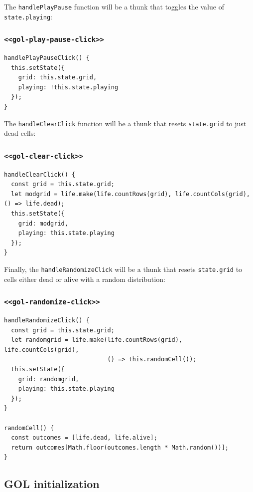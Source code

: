 \documentclass[11pt]{article}
\begin{document}
The \texttt{handlePlayPause} function will be a thunk that toggles the value of \texttt{state.playing}:

\subsubsection*{\texttt{<<gol-play-pause-click>>}}
\label{sec:orgfba2739}
\begin{verbatim}
handlePlayPauseClick() {
  this.setState({
    grid: this.state.grid,
    playing: !this.state.playing
  });
}
\end{verbatim}

The \texttt{handleClearClick} function will be a thunk that resets \texttt{state.grid} to just dead cells:

\subsubsection*{\texttt{<<gol-clear-click>>}}
\label{sec:orgad08d93}
\begin{verbatim}
handleClearClick() {
  const grid = this.state.grid;
  let modgrid = life.make(life.countRows(grid), life.countCols(grid), () => life.dead);
  this.setState({
    grid: modgrid,
    playing: this.state.playing
  });
}
\end{verbatim}

Finally, the \texttt{handleRandomizeClick} will be a thunk that resets \texttt{state.grid} to cells either dead or alive with a random distribution:

\subsubsection*{\texttt{<<gol-randomize-click>>}}
\label{sec:org8ac9ccc}
\begin{verbatim}
handleRandomizeClick() {
  const grid = this.state.grid;
  let randomgrid = life.make(life.countRows(grid), life.countCols(grid),
                             () => this.randomCell());
  this.setState({
    grid: randomgrid,
    playing: this.state.playing
  });
}

randomCell() {
  const outcomes = [life.dead, life.alive];
  return outcomes[Math.floor(outcomes.length * Math.random())];
}
\end{verbatim}

\subsection{GOL initialization}
\label{sec:org3a4ad5a}
\end{document}
